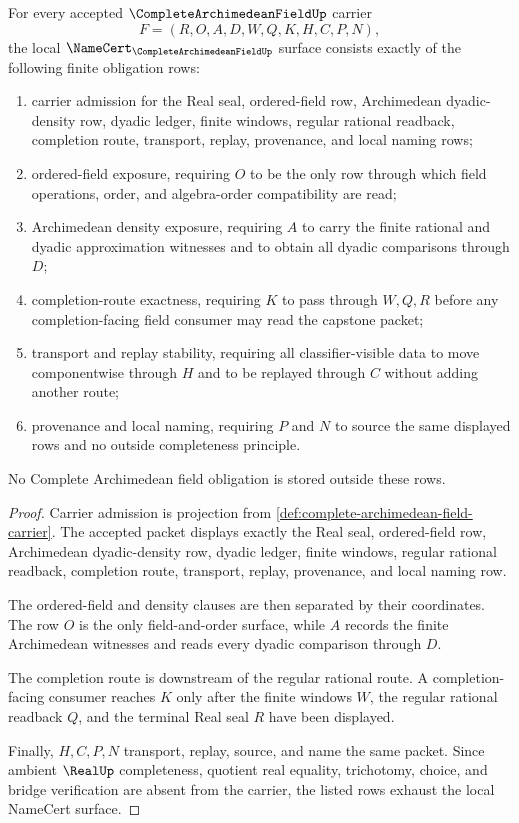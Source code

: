 \begin{theorem}
\label{thm:complete-archimedean-field-namecert-obligations}
For every accepted $\CompleteArchimedeanFieldUp$ carrier
$$
F=(R,O,A,D,W,Q,K,H,C,P,N),
$$
the local $\NameCert_{\CompleteArchimedeanFieldUp}$ surface consists exactly of the following finite obligation rows:
\begin{enumerate}
\item carrier admission for the Real seal, ordered-field row, Archimedean dyadic-density row, dyadic ledger, finite windows, regular rational readback, completion route, transport, replay, provenance, and local naming rows;
\item ordered-field exposure, requiring $O$ to be the only row through which field operations, order, and algebra-order compatibility are read;
\item Archimedean density exposure, requiring $A$ to carry the finite rational and dyadic approximation witnesses and to obtain all dyadic comparisons through $D$;
\item completion-route exactness, requiring $K$ to pass through $W,Q,R$ before any completion-facing field consumer may read the capstone packet;
\item transport and replay stability, requiring all classifier-visible data to move componentwise through $H$ and to be replayed through $C$ without adding another route;
\item provenance and local naming, requiring $P$ and $N$ to source the same displayed rows and no outside completeness principle.
\end{enumerate}
No Complete Archimedean field obligation is stored outside these rows.
\end{theorem}
\begin{proof}
Carrier admission is projection from \autoref{def:complete-archimedean-field-carrier}. The accepted packet displays exactly the Real seal, ordered-field row, Archimedean dyadic-density row, dyadic ledger, finite windows, regular rational readback, completion route, transport, replay, provenance, and local naming row.

The ordered-field and density clauses are then separated by their coordinates. The row $O$ is the only field-and-order surface, while $A$ records the finite Archimedean witnesses and reads every dyadic comparison through $D$.

The completion route is downstream of the regular rational route. A completion-facing consumer reaches $K$ only after the finite windows $W$, the regular rational readback $Q$, and the terminal Real seal $R$ have been displayed.

Finally, $H,C,P,N$ transport, replay, source, and name the same packet. Since ambient $\RealUp$ completeness, quotient real equality, trichotomy, choice, and bridge verification are absent from the carrier, the listed rows exhaust the local NameCert surface.
\end{proof}

